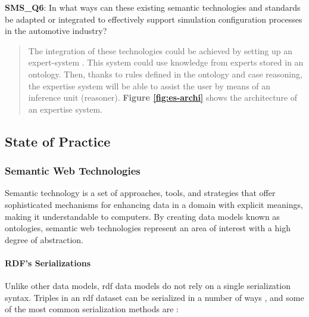             \textbf{SMS\_Q6}: In what ways can these existing semantic technologies and standards be adapted or integrated to effectively support simulation configuration processes in the automotive industry?
            \begin{quote}
                The integration of these technologies could be achieved by setting up an expert-system \cite{happel2006applications}. This system could use knowledge from experts stored in an ontology. Then, thanks to rules defined in the ontology and case reasoning, the expertise system will be able to assist the user by means of an inference unit (reasoner).  \textbf{Figure \ref{fig:es-archi}} shows the architecture of an expertise system.\\
            \end{quote}
        
    \subsection{State of Practice}
        \subsubsection{Semantic Web Technologies\label{sec:semtec}}
        Semantic technology is a set of approaches, tools, and strategies that offer sophisticated mechanisms for enhancing data in a domain with explicit meanings, making it understandable to computers. By creating data models known as ontologies, semantic web technologies represent an area of interest with a high degree of abstraction.\\ 
        
            \paragraph{RDF's Serializations}
                Unlike other data models, \acrshort{rdf} data models do not rely on a single serialization syntax. Triples in an \acrshort{rdf} dataset can be serialized in a number of ways \cite{martinez2012exchange}, and some of the most common serialization methods are : 

